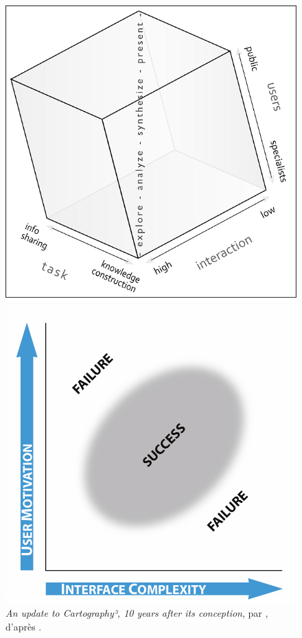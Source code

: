 \begin{figure}[H]
\hspace*{\fill}%
\begin{minipage}[t]{.46\linewidth}
\centering
\captionsetup{width=.9\linewidth}
\vspace{0pt}
\includegraphics[width=\linewidth]{img/CV35-Fig2a-600.png}
\caption{\og \textit{An update to Cartography³, 10 years after its conception}\fg{}, par \cite{coltekin_geovisualization_2018}, d'après \cite[10]{maceachren_geovisualization_2004}.}
\label{fig:cartography3}
\end{minipage} \hfill
\begin{minipage}[t]{.46\linewidth}
\centering
\captionsetup{width=.9\linewidth}
\vspace{0pt}
\includegraphics[width=\linewidth]{img/Roth_Interface_Complexity.png}

\end{minipage}
\end{figure}

